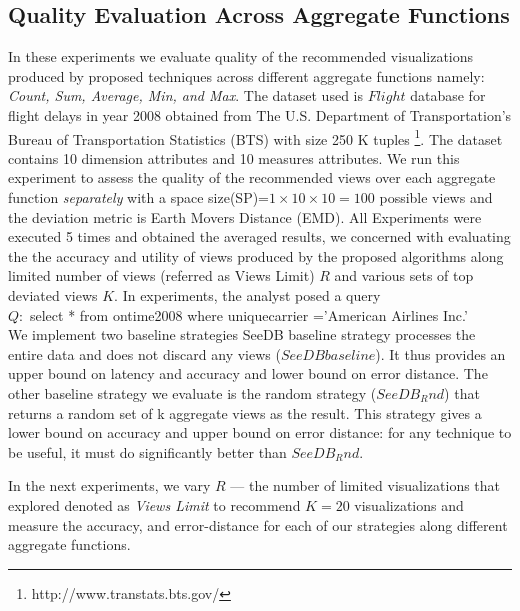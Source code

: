 \subsection{ Quality Evaluation Across Aggregate Functions }
In these experiments we evaluate quality of the recommended visualizations produced by proposed techniques 
 across different aggregate functions namely: \emph{Count, Sum, Average, Min, and Max}. 
The dataset used is $Flight$ database for flight delays in year 2008 obtained from 
The U.S. Department of Transportation's Bureau of Transportation Statistics (BTS) with 
size 250 K tuples \footnote { http://www.transtats.bts.gov/}. 
The dataset contains 10 dimension attributes and 10 measures attributes. 
We run this experiment to assess the quality of the recommended views 
over each aggregate function \emph{separately} 
 with a space size(SP)=$1 \times 10 \times 10=100$ possible views and 
the deviation metric is Earth Movers Distance (EMD). All Experiments were executed 
5 times and obtained the averaged results, we concerned with evaluating the 
the accuracy and utility of views produced by the proposed algorithms along 
limited number of views (referred as Views Limit) $R$ and various sets of top deviated views $K$. In experiments, the analyst
posed a query\\
 $Q:$ select * from ontime2008 where uniquecarrier ='American Airlines Inc.' \\ 
We implement two baseline strategies SeeDB baseline strategy processes the entire data 
and does not discard any views ($SeeDB baseline$). It thus provides an upper bound on 
latency and accuracy and lower bound on error distance.
The other baseline strategy we evaluate is the random strategy ($SeeDB_Rnd$) that 
returns a random set of k aggregate views as the result. This strategy gives a lower bound on 
accuracy and upper bound on error distance: for any technique to be useful, it must do 
significantly better than $SeeDB_Rnd$.

In the next experiments, we vary $R$ — the number of limited visualizations that explored denoted as \emph{Views Limit} 
to recommend $K=20$ visualizations and measure the accuracy, and error-distance for each of our
strategies along different aggregate functions.\\

